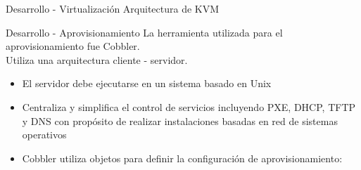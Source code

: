 \begin{frame}{Desarrollo - Virtualización}
    \vspace{0cm} {Arquitectura de KVM}
    \vspace{0.5cm}
    \begin{figure}[ht]
       \raggedright
       \vspace{-0.50cm} 
    \end{figure}

\end{frame}


\begin{frame}{Desarrollo - Aprovisionamiento}
    \vspace{-1.5cm}
    La herramienta utilizada para el aprovisionamiento fue Cobbler.
    \\
    Utiliza una arquitectura cliente - servidor.
    \begin{itemize}
        \item El servidor debe ejecutarse en un sistema basado en Unix
        \item Centraliza y simplifica el control de servicios incluyendo PXE, DHCP, TFTP y DNS con propósito de realizar instalaciones basadas en red de sistemas operativos
        \item Cobbler utiliza objetos para definir la configuración de aprovisionamiento:
    \end{itemize}
    
\end{frame}

